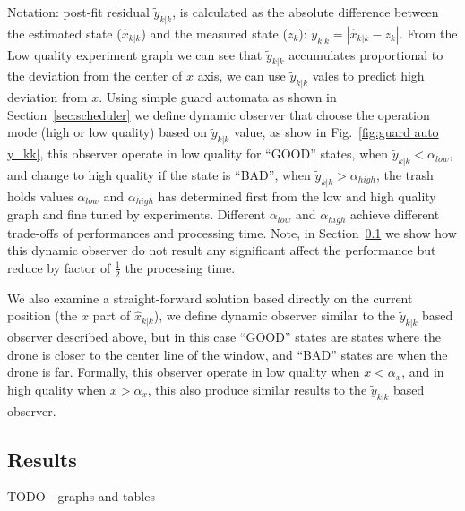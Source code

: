 \documentclass{sig-alternate-ipsn13}
\begin{document}
Notation: post-fit residual $\tilde{y}_{k|k}$, is calculated as the absolute difference between the estimated state ($\hat{x}_{k|k}$) and the measured state ($z_k$): $\tilde{y}_{k|k} = |  \hat{x}_{k|k} - z_k |$.
From the Low quality experiment graph we can see that $\tilde{y}_{k|k}$ accumulates proportional to the deviation from the center of $x$ axis, we can use $\tilde{y}_{k|k}$ vales to predict high deviation from $x$.
Using simple guard automata as shown in Section~\ref{sec:scheduler} we define dynamic observer that choose the operation mode (high or low quality) based on $\tilde{y}_{k|k}$ value, as show in Fig.~\ref{fig:guard auto y_kk}, this observer operate in low quality for ``GOOD'' states, when $\tilde{y}_{k|k} < \alpha_{low}$, and change to high quality if the state is ``BAD'', when $\tilde{y}_{k|k} > \alpha_{high}$, the trash holds values $ \alpha_{low}$ and $ \alpha_{high}$ has determined first from the low and high quality graph and fine tuned by experiments. 
Different $ \alpha_{low}$ and $ \alpha_{high}$ achieve different trade-offs of performances and processing time.
Note, in Section~\ref{sec:results} we show how this dynamic observer do not result any significant affect the performance but reduce by factor of $\frac{1}{2}$ the processing time.

We also examine a straight-forward solution based directly on the current position (the $x$ part of $\hat{x}_{k|k}$), we define dynamic observer similar to the $\tilde{y}_{k|k}$ based observer described above, but in this case ``GOOD'' states are states where the drone is closer to the center line of the window, and ``BAD'' states are when the drone is far.
Formally, this observer operate in low quality when $x < \alpha_x$, and in high quality when $x > \alpha_x$, this also produce similar results to the $\tilde{y}_{k|k}$ based observer.




\subsection{Results}
\label{sec:results}
TODO - graphs and tables
\end{document}
